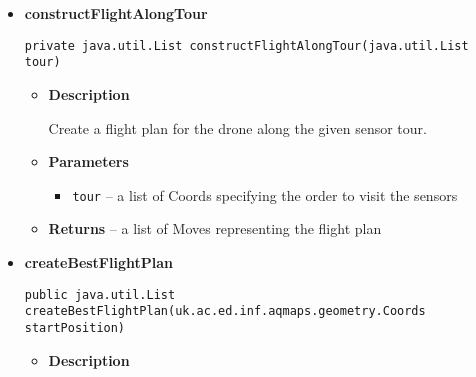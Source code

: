 \documentclass[11pt,a4paper]{report}
\begin{document}
{{{{{{{{{{{{{{{{{{\begin{itemize}
{\begin{itemize}
{Computes the length of a flight plan which follows the given sensor coordinate tour.
}
\item{
{\bf  Parameters}
  \begin{itemize}
   \item{
\texttt{tour} -- a list of Coords specifying the order to visit the sensors}
  \end{itemize}
}%
\item{{\bf  Returns} -- 
the number of moves in the flight plan 
}%
\end{itemize}
}%
\item{ 
\hypertarget{uk.ac.ed.inf.aqmaps.flightplanning.FlightPlanner.constructFlightAlongTour(java.util.List)}{{\bf  constructFlightAlongTour}\\}
\begin{lstlisting}[frame=none]
private java.util.List constructFlightAlongTour(java.util.List tour)\end{lstlisting} %
\begin{itemize}
\item{
{\bf  Description}

Create a flight plan for the drone along the given sensor tour.
}
\item{
{\bf  Parameters}
  \begin{itemize}
   \item{
\texttt{tour} -- a list of Coords specifying the order to visit the sensors}
  \end{itemize}
}%
\item{{\bf  Returns} -- 
a list of Moves representing the flight plan 
}%
\end{itemize}
}%
\item{ 
\hypertarget{uk.ac.ed.inf.aqmaps.flightplanning.FlightPlanner.createBestFlightPlan(uk.ac.ed.inf.aqmaps.geometry.Coords)}{{\bf  createBestFlightPlan}\\}
\begin{lstlisting}[frame=none]
public java.util.List createBestFlightPlan(uk.ac.ed.inf.aqmaps.geometry.Coords startPosition)\end{lstlisting} %
\begin{itemize}
\item{
{\bf  Description}

}
\end{itemize}}
\end{itemize}}}}}}}}}}}}}}}}}}}
\end{document}
